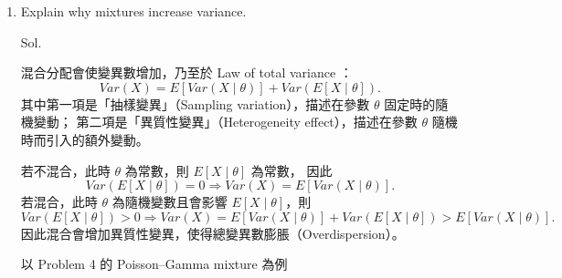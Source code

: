 \documentclass[a4paper, 12pt]{article}  %
\begin{document}
\begin{enumerate}
        Let $$X\mid P=p \sim \mathrm{Bin}(n,p),　P\sim \mathrm{Beta}(\alpha,\beta),　\alpha,\beta>0,$$
        where$$f_P(p)=\frac{1}{B(\alpha, \beta)}p^{\alpha-1}(1-p)^{\beta-1},　0<p<1,$$
        and $$B(\alpha,\beta)=\frac{\Gamma(\alpha)\Gamma(\beta)}{\Gamma(\alpha+\beta)}.$$
        Also,$$P_{X\mid P}(x\mid p)=\binom{n}{x}p^x(1-p)^{n-x},　x=0,1,\dots,n.$$
        Then we compute
        \begin{align*}
        P(X=x)
        &=\int_0^1 P_{X\mid P}(x\mid p)f_P(p)dp \\
        &=\int_0^1 \binom{n}{x}p^x(1-p)^{n-x}\cdot \frac{1}{B(\alpha,\beta)}p^{\alpha-1}(1-p)^{\beta-1}dp \\
        &=\binom{n}{x}\frac{1}{B(\alpha,\beta)}\int_0^1 p^{x+\alpha-1}(1-p)^{n-x+\beta-1}dp \\
        &=\binom{n}{x}\frac{B(x+\alpha,\ n-x+\beta)}{B(\alpha,\beta)} \\
        &=\binom{n}{x}\frac{\Gamma(x+\alpha)\Gamma(n-x+\beta)}{\Gamma(n+\alpha+\beta)}\cdot \frac{\Gamma(\alpha+\beta)}{\Gamma(\alpha)\Gamma(\beta)},　x=0,1,\dots,n.
        \end{align*}
        It is the Beta--Binomial pmf.

        \item Explain why mixtures increase variance.
        
        Sol.

        混合分配會使變異數增加，乃至於 Law of total variance ：
        $$Var(X)=E\left[Var(X\mid \theta)\right]+Var\left(E[X\mid \theta]\right).$$
        其中第一項是「抽樣變異」（Sampling variation），描述在參數 $\theta$ 固定時的隨機變動；
        第二項是「異質性變異」（Heterogeneity effect），描述在參數 $\theta$ 隨機時而引入的額外變動。

        若不混合，此時 $\theta$ 為常數，則 $E[X\mid \theta]$ 為常數，
        因此
        $$Var\left(E[X\mid \theta]\right)=0\Rightarrow Var(X)=E\left[Var(X\mid \theta)\right].$$
        若混合，此時 $\theta$ 為隨機變數且會影響 $E[X\mid\theta]$，則
        $$Var\left(E[X\mid \theta]\right)>0\Rightarrow Var(X)=E\left[Var(X\mid \theta)\right]+Var\left(E[X\mid \theta]\right)>E\!\left[Var(X\mid \theta)\right].$$
        因此混合會增加異質性變異，使得總變異數膨脹（Overdispersion）。

        以 Problem 4 的 Poisson–Gamma mixture 為例


\end{enumerate}
\end{document}
